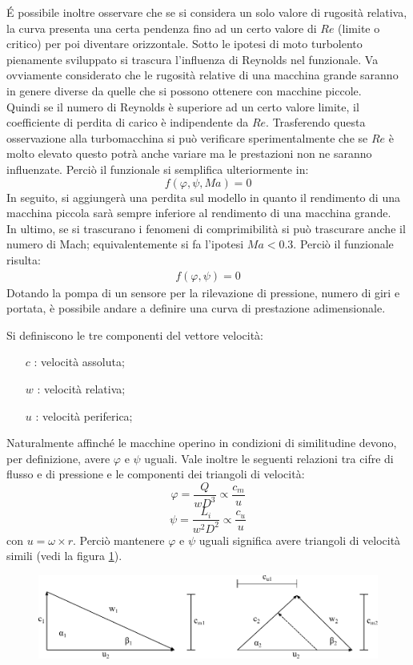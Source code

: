 \'E possibile inoltre osservare che se si considera un solo valore di rugosità relativa, la curva presenta una certa pendenza fino ad un certo valore di $Re$ (limite o critico) per poi diventare orizzontale. Sotto le ipotesi di moto turbolento pienamente sviluppato si trascura l’influenza di Reynolds nel funzionale. Va ovviamente considerato che le rugosità relative di una macchina grande saranno in genere diverse da quelle che si possono ottenere con macchine piccole.\\
Quindi se il numero di Reynolds è superiore ad un certo valore limite, il coefficiente di perdita di carico è indipendente da $Re$. Trasferendo questa osservazione alla turbomacchina si può verificare sperimentalmente che se $Re$ è molto elevato questo potrà anche variare ma le prestazioni non ne saranno influenzate. Perciò il funzionale si semplifica ulteriormente in:
\begin{equation}
f(\varphi,\psi,Ma)=0
\end{equation}
In seguito, si aggiungerà una perdita sul modello in quanto il rendimento di una macchina piccola sarà sempre inferiore al rendimento di una macchina grande.\\
In ultimo, se si trascurano i fenomeni di comprimibilità si può trascurare anche il numero di Mach; equivalentemente si fa l'ipotesi $Ma<0.3$. Perciò il funzionale risulta:
\begin{align*}
f(\varphi,\psi)=0
\end{align*}
Dotando la pompa di un sensore per la rilevazione di pressione, numero di giri e portata, è possibile andare a definire una curva di prestazione adimensionale.

Si definiscono le tre componenti del vettore velocità:
\begin{itemize}
\item[$c$]: velocità assoluta;
\item[$w$]: velocità relativa;
\item[$u$]: velocità periferica;
\end{itemize}
Naturalmente affinché le macchine operino in condizioni di similitudine devono, per definizione, avere $\varphi$ e $\psi$ uguali. Vale inoltre le seguenti relazioni tra cifre di flusso e di pressione e le componenti dei triangoli di velocità:
\begin{equation}
\varphi=\frac{Q}{w D^3} \propto \frac{c_m}{u}
\end{equation}
\begin{equation}
\psi = \frac{L_i}{w^2 D^2} \propto \frac{c_u}{u}
\end{equation}
con $u= \omega \times r$. Perciò mantenere $\varphi$ e $\psi$ uguali significa avere triangoli di velocità simili (vedi la figura \ref{fig:tria}).
\begin{figure}
\centering
  \includegraphics[width=.8\textwidth]{fig/triang.pdf}
\caption{}
\label{fig:tria}
\end{figure}

